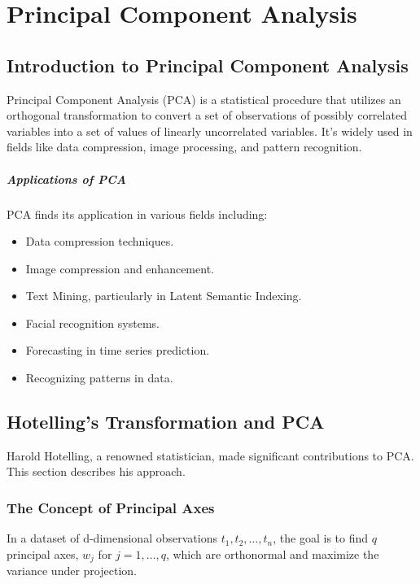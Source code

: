 \chapter{Principal Component Analysis}
\section{Introduction to Principal Component Analysis}

Principal Component Analysis (PCA) is a statistical procedure that utilizes an orthogonal transformation to convert a set of observations of possibly correlated variables into a set of values of linearly uncorrelated variables. It's widely used in fields like data compression, image processing, and pattern recognition.

\paragraph{Applications of PCA}
PCA finds its application in various fields including:
\begin{itemize}
    \setlength\itemsep{0.1em}
    \item Data compression techniques.
    \item Image compression and enhancement.
    \item Text Mining, particularly in Latent Semantic Indexing.
    \item Facial recognition systems.
    \item Forecasting in time series prediction.
    \item Recognizing patterns in data.
\end{itemize}

\section{Hotelling's Transformation and PCA}

Harold Hotelling, a renowned statistician, made significant contributions to PCA. This section describes his approach.

\subsection{The Concept of Principal Axes}

In a dataset of d-dimensional observations \( t_1, t_2, \ldots, t_n \), the goal is to find \( q \) principal axes, \( w_j \) for \( j = 1, \ldots, q \), which are orthonormal and maximize the variance under projection.

